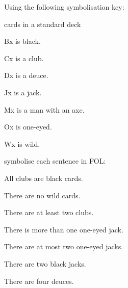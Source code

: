 \solutions
\problempart
\label{pr.FOLcards}
Using the following symbolisation key:
\begin{ekey}
\item[\text{domain}] cards in a standard deck
\item[Bx]  is black.
\item[Cx]  is a club.
\item[Dx]  is a deuce.
\item[Jx]  is a jack.
\item[Mx]  is a man with an axe.
\item[Ox]  is one-eyed.
\item[Wx]  is wild.
\end{ekey}
symbolise each sentence in FOL:
\begin{earg}
\item All clubs are black cards.
\item[] 
\item There are no wild cards.
\item[] 
\item There are at least two clubs.
\item[] 
\item There is more than one one-eyed jack.
\item[] 
\item There are at most two one-eyed jacks.
\item[] 
\item There are two black jacks.
\item[] 
\item There are four deuces.
\item[] 
\end{earg}
